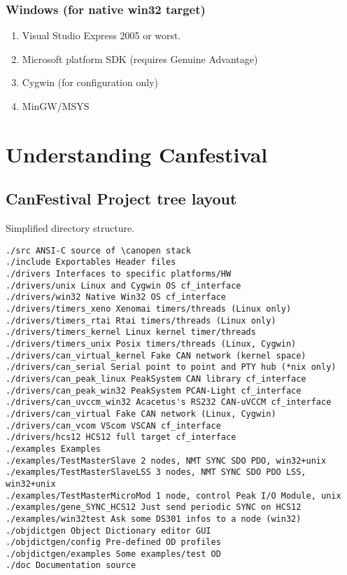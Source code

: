 \documentclass[12pt,english,a4paper]{book}
\newcommand{\canopen}{CANopen }
\begin{document}
\subsubsection{Windows (for native win32 target)}

\begin{enumerate}
\item Visual Studio Express 2005 or worst.
\item Microsoft platform SDK (requires Genuine Advantage)
\item Cygwin (for configuration only)
\item MinGW/MSYS
\end{enumerate}

\section{Understanding Canfestival}

\subsection{CanFestival Project tree layout}
Simplified directory structure.
\begin{verbatim}
./src ANSI-C source of \canopen stack
./include Exportables Header files
./drivers Interfaces to specific platforms/HW
./drivers/unix Linux and Cygwin OS cf_interface
./drivers/win32 Native Win32 OS cf_interface
./drivers/timers_xeno Xenomai timers/threads (Linux only)
./drivers/timers_rtai Rtai timers/threads (Linux only)
./drivers/timers_kernel Linux kernel timer/threads
./drivers/timers_unix Posix timers/threads (Linux, Cygwin)
./drivers/can_virtual_kernel Fake CAN network (kernel space)
./drivers/can_serial Serial point to point and PTY hub (*nix only)
./drivers/can_peak_linux PeakSystem CAN library cf_interface
./drivers/can_peak_win32 PeakSystem PCAN-Light cf_interface
./drivers/can_uvccm_win32 Acacetus's RS232 CAN-uVCCM cf_interface
./drivers/can_virtual Fake CAN network (Linux, Cygwin)
./drivers/can_vcom VScom VSCAN cf_interface
./drivers/hcs12 HCS12 full target cf_interface
./examples Examples
./examples/TestMasterSlave 2 nodes, NMT SYNC SDO PDO, win32+unix
./examples/TestMasterSlaveLSS 3 nodes, NMT SYNC SDO PDO LSS, win32+unix
./examples/TestMasterMicroMod 1 node, control Peak I/O Module, unix
./examples/gene_SYNC_HCS12 Just send periodic SYNC on HCS12
./examples/win32test Ask some DS301 infos to a node (win32)
./objdictgen Object Dictionary editor GUI
./objdictgen/config Pre-defined OD profiles
./objdictgen/examples Some examples/test OD
./doc Documentation source
\end{verbatim}
\end{document}
